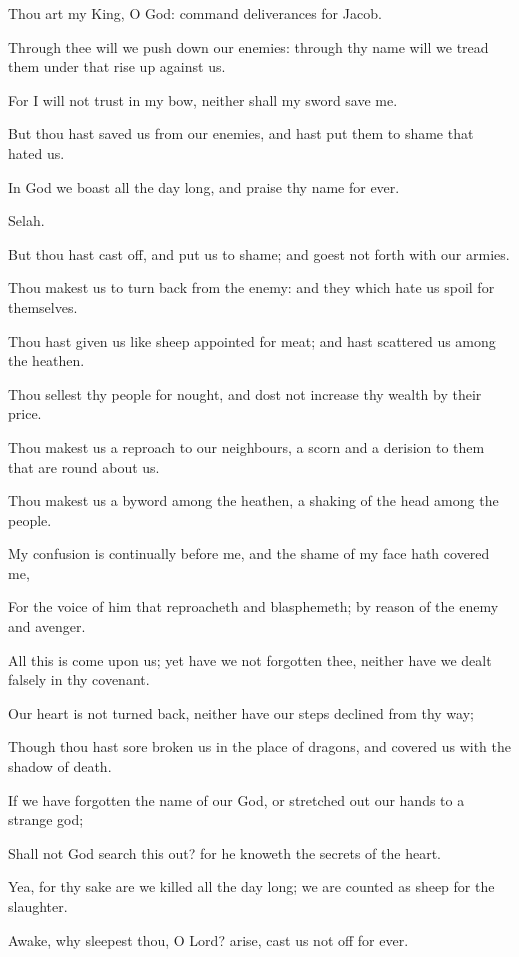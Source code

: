 \verse Thou art my King, O God: command deliverances for Jacob.

\verse Through thee will we push down our enemies: through thy name will we tread them under that rise up against us.

\verse For I will not trust in my bow, neither shall my sword save me.

\verse But thou hast saved us from our enemies, and hast put them to shame that hated us.

\verse In God we boast all the day long, and praise thy name for ever.

Selah.

\verse But thou hast cast off, and put us to shame; and goest not forth with our armies.

\verse Thou makest us to turn back from the enemy: and they which hate us spoil for themselves.

\verse Thou hast given us like sheep appointed for meat; and hast scattered us among the heathen.

\verse Thou sellest thy people for nought, and dost not increase thy wealth by their price.

\verse Thou makest us a reproach to our neighbours, a scorn and a derision to them that are round about us.

\verse Thou makest us a byword among the heathen, a shaking of the head among the people.

\verse My confusion is continually before me, and the shame of my face hath covered me,

\verse For the voice of him that reproacheth and blasphemeth; by reason of the enemy and avenger.

\verse All this is come upon us; yet have we not forgotten thee, neither have we dealt falsely in thy covenant.

\verse Our heart is not turned back, neither have our steps declined from thy way;

\verse Though thou hast sore broken us in the place of dragons, and covered us with the shadow of death.

\verse If we have forgotten the name of our God, or stretched out our hands to a strange god;

\verse Shall not God search this out? for he knoweth the secrets of the heart.

\verse Yea, for thy sake are we killed all the day long; we are counted as sheep for the slaughter.

\verse Awake, why sleepest thou, O Lord? arise, cast us not off for ever.

